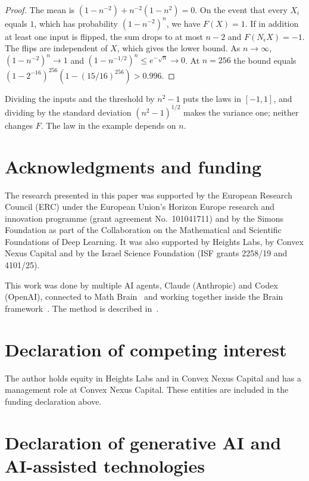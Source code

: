 \documentclass[11pt]{amsart}
\theoremstyle{remark}
\numberwithin{equation}{section}
\begin{document}
\begin{proof}
The mean is $(1-n^{-2})+n^{-2}(1-n^2)=0$. On the event that every $X_i$ equals $1$, which has probability $(1-n^{-2})^n$, we have $F(X)=1$. If in addition at least one input is flipped, the sum drops to at most $n-2$ and $F(N_\epsilon X)=-1$. The flips are independent of $X$, which gives the lower bound. As $n\to\infty$, $(1-n^{-2})^n\to1$ and $(1-n^{-1/2})^n\le e^{-\sqrt n}\to0$. At $n=256$ the bound equals $(1-2^{-16})^{256}(1-(15/16)^{256})>0.996$.
\end{proof}

Dividing the inputs and the threshold by $n^2-1$ puts the laws in $[-1,1]$, and dividing by the standard deviation $(n^2-1)^{1/2}$ makes the variance one; neither changes $F$. The law in the example depends on $n$.

\section*{Acknowledgments and funding}

The research presented in this paper was supported by the European Research Council (ERC) under the European Union's Horizon Europe research and innovation programme (grant agreement No.~101041711) and by the Simons Foundation as part of the Collaboration on the Mathematical and Scientific Foundations of Deep Learning. It was also supported by Heights Labs, by Convex Nexus Capital and by the Israel Science Foundation (ISF grants 2258/19 and 4101/25).

This work was done by multiple AI agents, Claude (Anthropic) and Codex (OpenAI), connected to Math Brain~\cite{MathBrainRepo} and working together inside the Brain framework~\cite{BrainFramework}. The method is described in~\cite{MathBrainPaper}.

\section*{Declaration of competing interest}

The author holds equity in Heights Labs and in Convex Nexus Capital and has a management role at Convex Nexus Capital. These entities are included in the funding declaration above.

\section*{Declaration of generative AI and AI-assisted technologies}
\end{document}
